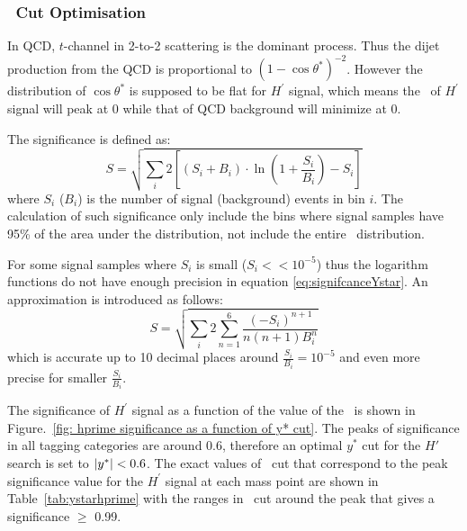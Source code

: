 \subsubsection{\ystar\ Cut Optimisation}
\label{section:ystarCutOptimization}


In QCD, $t$-channel in 2-to-2 scattering is the dominant process. Thus the dijet production from the QCD is proportional to $\displaystyle{(1-\cos\theta^{*})^{-2}}$. However the distribution of $\cos\theta^{*}$ is supposed to be flat for $H^\prime$ signal, which means the \ystar\ of $H^\prime$ signal will peak at 0 while that of QCD background will minimize at 0.


The significance is defined as: 
\begin{equation}
\label{eq:signifcanceYstar} %
S  = \sqrt{\sum_{i}{2\left[ \left(S_{i}+B_{i} \right)\cdot \ln \left(1+\frac{S_{i}}{B_{i}}\right)-S_{i}\right]}}
\end{equation}
where $S_i$ ($B_i$) is the number of signal (background) events in bin $i$. 
The calculation of such significance only include the bins where signal samples have 95\% of the area under the distribution, not include the entire \mjj\ distribution.

For some signal samples where $S_i$ is small ($S_i << 10^{-5}$) thus the logarithm functions do not have
enough precision in equation \ref{eq:signifcanceYstar}. An approximation is introduced as follows:
\begin{equation}
S = \sqrt{\sum_{i}{2\sum_{n=1}^{6}{\frac{(-S_i)^{n+1}}{n \left(n+1 \right) B_i^n}}}}
\end{equation}
which is accurate up to 10 decimal places around $\frac{S_i}{B_i} = 10^{-5}$ and even more precise for smaller $\frac{S_i}{B_i}$.

The significance of $H^\prime$ signal as a function 
of the value of the \ystar\ is shown in Figure.~\ref{fig: hprime significance as a function of y* cut}. The peaks of significance in all tagging categories are around 0.6, therefore an optimal $y^{*}$ cut for the $H'$ search is set to
$|y^\ast| < 0.6$. The exact values of \ystar\ cut that correspond to the peak significance value for the $H^\prime$ signal at each mass point are shown in Table~\ref{tab:ystarhprime} with the ranges in \ystar\ cut around the peak that gives a significance $\geq$ 0.99.

